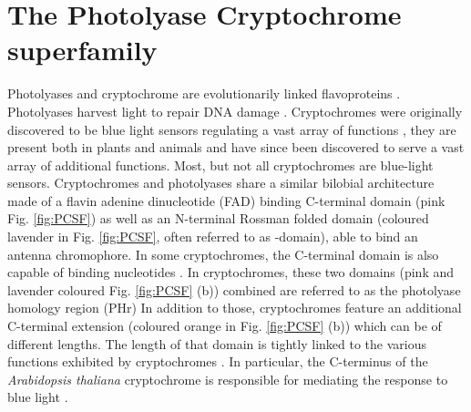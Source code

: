\section{The Photolyase Cryptochrome superfamily}\label{sec:PCSF}
Photolyases and cryptochrome are evolutionarily linked flavoproteins \parencite{conradPhotochemistryFlavoproteinLight2014}. Photolyases harvest light to repair DNA damage \parencite{sancarMechanismsDNARepair2016}. Cryptochromes were originally discovered to be blue light sensors regulating a vast array of functions \parencite{ahmadHY4GeneThaliana1993}, they are present both in plants and animals \parencite{meiEvolutionaryHistoryPhotolyase2015} and have since been discovered to serve a vast array of additional functions. Most, but not all cryptochromes are blue-light sensors. Cryptochromes and photolyases share a similar bilobial architecture made of a flavin adenine dinucleotide (FAD) binding C-terminal domain (pink Fig. \ref{fig:PCSF}) as well as an N-terminal Rossman folded domain (coloured lavender in Fig. \ref{fig:PCSF}, often referred to as \textalpha-\textbeta domain), able to bind an antenna chromophore. In some cryptochromes, the C-terminal domain is also capable of binding nucleotides \parencite{franzStructureBifunctionalCryptochrome2018}. In cryptochromes, these two domains (pink and lavender coloured Fig. \ref{fig:PCSF} (b)) combined are referred to as the photolyase homology region (PHr) In addition to those, cryptochromes feature an additional C-terminal extension (coloured orange in Fig. \ref{fig:PCSF} (b)) which can be of different lengths. The length of that domain is tightly linked to the various functions exhibited by cryptochromes \parencite{chavesFunctionalEvolutionPhotolyase2006}. In particular, the C-terminus of the \textit{Arabidopsis thaliana} cryptochrome is responsible for mediating the response to blue light \parencite{kongCterminalKinaseFragment2007}. 

